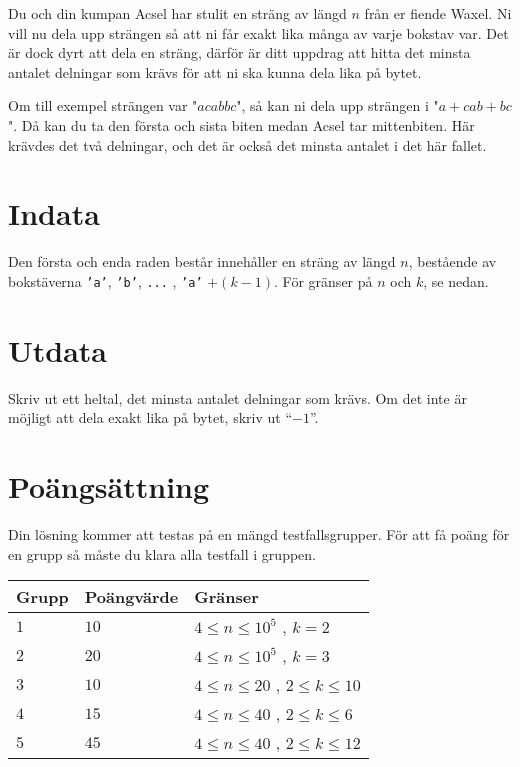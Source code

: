 Du och din kumpan Acsel har stulit en sträng av längd $n$ från er fiende Waxel. Ni vill nu dela upp strängen så att ni får
exakt lika många av varje bokstav var. Det är dock dyrt att dela en sträng, därför är ditt uppdrag att hitta det minsta antalet delningar som krävs för att ni ska kunna dela lika på bytet.

Om till exempel strängen var "$\textit{acabbc}$", så kan ni dela upp strängen i
"$\textit{a}+\textit{cab}+\textit{bc}$". Då kan du ta den första och sista biten medan Acsel tar mittenbiten. Här krävdes det två delningar,
och det är också det minsta antalet i det här fallet.

\section*{Indata}
Den första och enda raden består innehåller en sträng av längd $n$, bestående av bokstäverna \texttt{'a'}, \texttt{'b'}, \texttt{...} , \texttt{'a'} $+(k-1)$. För gränser på $n$ och $k$, se nedan.

\section*{Utdata}
Skriv ut ett heltal, det minsta antalet delningar som krävs. Om det inte är möjligt att dela exakt lika på bytet, skriv ut ``$-1$''.

\section*{Poängsättning}
Din lösning kommer att testas på en mängd testfallsgrupper.
För att få poäng för en grupp så måste du klara alla testfall i gruppen.

\noindent
\begin{tabular}{| l | l | p{12cm} |}
  \hline
  Grupp & Poängvärde & Gränser \\ \hline
  $1$   & $10$       & $4 \le n \le 10^5$ , $k = 2$ \\ \hline
  $2$   & $20$       & $4 \le n \le 10^5$ , $k = 3$ \\ \hline
  $3$   & $10$       & $4 \le n \le 20$ , $2 \leq k \leq 10$ \\ \hline
  $4$   & $15$       & $4 \le n \le 40$ , $2 \leq k \leq 6$ \\ \hline
  $5$   & $45$       & $4 \le n \le 40$ , $2 \leq k \leq 12$ \\ \hline
\end{tabular}